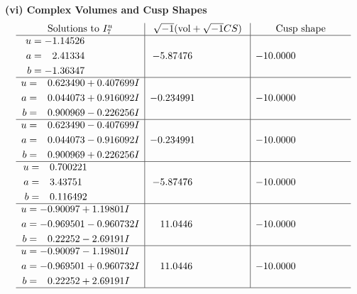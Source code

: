 \documentclass[1p]{elsarticle_modified}
\theoremstyle{definition}
\newcommand{\I}{\sqrt{-1}}
\begin{document}
\newpage\flushleft \textbf{(vi) Complex Volumes and Cusp Shapes}
$$\begin{array}{c|c|c}  
\text{Solutions to }I^u_{7}& \I (\text{vol} + \sqrt{-1}CS) & \text{Cusp shape}\\
 \hline 
\begin{aligned}
u &= -1.14526\phantom{ +0.000000I} \\
a &= \phantom{-}2.41334\phantom{ +0.000000I} \\
b &= -1.36347\phantom{ +0.000000I}\end{aligned}
 & -5.87476\phantom{ +0.000000I} & -10.0000\phantom{ +0.000000I} \\ \hline\begin{aligned}
u &= \phantom{-}0.623490 + 0.407699 I \\
a &= \phantom{-}0.044073 + 0.916092 I \\
b &= \phantom{-}0.900969 - 0.226256 I\end{aligned}
 & -0.234991\phantom{ +0.000000I} & -10.0000\phantom{ +0.000000I} \\ \hline\begin{aligned}
u &= \phantom{-}0.623490 - 0.407699 I \\
a &= \phantom{-}0.044073 - 0.916092 I \\
b &= \phantom{-}0.900969 + 0.226256 I\end{aligned}
 & -0.234991\phantom{ +0.000000I} & -10.0000\phantom{ +0.000000I} \\ \hline\begin{aligned}
u &= \phantom{-}0.700221\phantom{ +0.000000I} \\
a &= \phantom{-}3.43751\phantom{ +0.000000I} \\
b &= \phantom{-}0.116492\phantom{ +0.000000I}\end{aligned}
 & -5.87476\phantom{ +0.000000I} & -10.0000\phantom{ +0.000000I} \\ \hline\begin{aligned}
u &= -0.90097 + 1.19801 I \\
a &= -0.969501 - 0.960732 I \\
b &= \phantom{-}0.22252 - 2.69191 I\end{aligned}
 & \phantom{-}11.0446\phantom{ +0.000000I} & -10.0000\phantom{ +0.000000I} \\ \hline\begin{aligned}
u &= -0.90097 - 1.19801 I \\
a &= -0.969501 + 0.960732 I \\
b &= \phantom{-}0.22252 + 2.69191 I\end{aligned}
 & \phantom{-}11.0446\phantom{ +0.000000I} & -10.0000\phantom{ +0.000000I}\\
 \hline 
 \end{array}$$\newpage\newpage\renewcommand{\arraystretch}{1}
\end{document}
